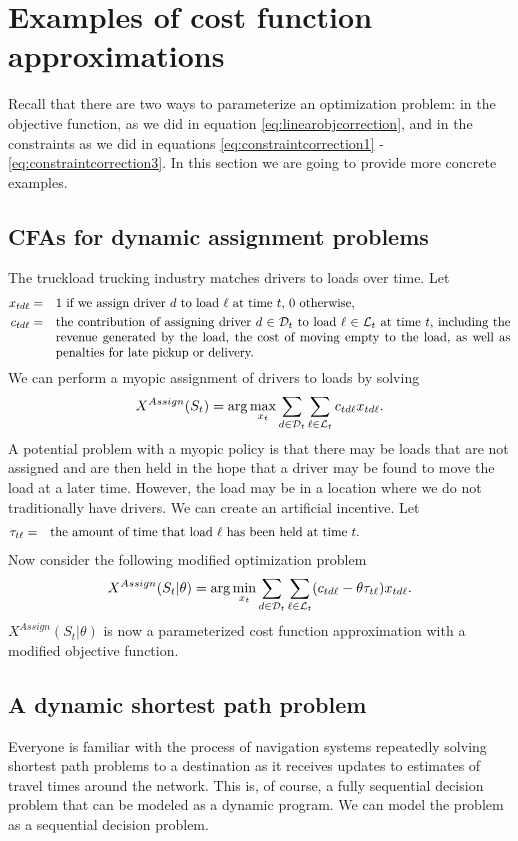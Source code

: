\documentclass[11pt,oneside,fleqn,reqno,titlepage]{article}
\newcommand{\bn}{\begin{eqnarray}}
\newcommand{\en}{\end{eqnarray}}
\newcommand{\bns}{\begin{eqnarray*}}
\newcommand{\ens}{\end{eqnarray*}}
\newcommand{\textwrap}{\parbox[t]{5.0in}}
\newcounter{example}
\newcommand{\argmax}{{\rm arg}\max}
\newcommand{\argmin}{{\rm arg}\min}
\def \Dcal{{\cal D}}
\def \Lcal{{\cal L}}
\begin{document}
\section{Examples of cost function approximations}
\label{sec:examplecfas}
Recall that there are two ways to parameterize an optimization problem: in the objective function, as we did in equation \eqref{eq:linearobjcorrection}, and in the constraints as we did in equations \eqref{eq:constraintcorrection1} - \eqref{eq:constraintcorrection3}.  In this section we are going to provide more concrete examples.



\subsection{CFAs for dynamic assignment problems}

The truckload trucking industry matches drivers to loads over time.  Let
\bns
x_{td\ell} &=& \textwrap{1 if we assign driver $d$ to load $\ell$ at time $t$, 0 otherwise,}\\
c_{td\ell} &=& \textwrap{the contribution of assigning driver $d\in\Dcal_t$ to load $\ell\in\Lcal_t$ at time $t$, including the revenue generated by the load, the cost of moving empty to the load, as well as penalties for late pickup or delivery.}
\ens
We can perform a myopic assignment of drivers to loads by solving
\bn
X^{Assign}(S_t) = \argmax_{x_t} \sum_{d\in\Dcal_t} \sum_{\ell\in\Lcal_t} c_{td\ell} x_{td\ell}. \label{eq:cfadriver}
\en
A potential problem with a myopic policy is that there may be loads that are not assigned and are then held in the hope that a driver may be found to move the load at a later time.  However, the load may be in a location where we do not traditionally have drivers.  We can create an artificial incentive.  Let
\bns
\tau_{t\ell} &=& \textwrap{the amount of time that load $\ell$ has been held at time $t$.}
\ens
Now consider the following modified optimization problem
\bn
X^{Assign}(S_t|\theta) = \argmin_{x_t} \sum_{d\in\Dcal_t} \sum_{\ell\in\Lcal_t} (c_{td\ell} -\theta \tau_{t \ell})x_{td\ell}. \label{eq:cfadriver2}
\en
$X^{Assign}(S_t|\theta)$ is now a parameterized cost function approximation with a modified objective function.


\subsection{A dynamic shortest path problem}
\label{sec:dynamicshortestpath}
Everyone is familiar with the process of navigation systems repeatedly solving shortest path problems to a destination as it receives updates to estimates of travel times around the network.  This is, of course, a fully sequential decision problem that can be modeled as a dynamic program.  We can model the problem as a sequential decision problem.
\end{document}
